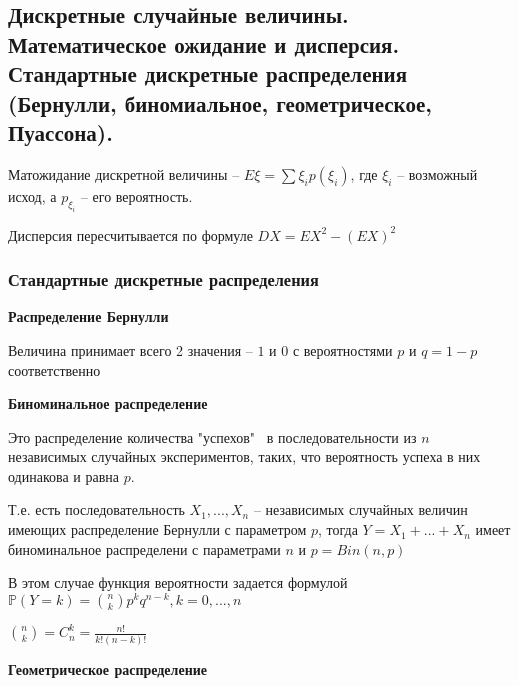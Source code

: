 \subsection{Дискретные случайные величины. Математическое ожидание и дисперсия. Стандартные дискретные распределения (Бернулли, биномиальное, геометрическое, Пуассона).}




Матожидание дискретной величины -- $E\xi = \sum \xi_i p(\xi_i)$, где $\xi_i$ -- возможный исход, а $p_{\xi_i}$ -- его вероятность.

Дисперсия пересчитывается по формуле $DX = EX^2 - (EX)^2$

\subsubsection{ Стандартные дискретные распределения}

{\bf Распределение Бернулли}

Величина принимает всего 2 значения -- $1$ и $0$ с вероятностями $p$ и $q = 1 - p$ соответственно

{\bf Биноминальное распределение}

Это распределение количества "успехов" \ в последовательности из $n$ независимых случайных экспериментов, таких, что вероятность успеха в них одинакова и равна $p$.

Т.е. есть последовательность $X_1, ..., X_n$ -- независимых случайных величин имеющих распределение Бернулли с параметром $p$, тогда $Y = X_1 + ... + X_n$ имеет биноминальное распределени с параметрами $n$ и $p = Bin(n, p)$ 

В этом случае функция вероятности задается формулой $\mathbb{P}(Y = k) = {n \choose k} p^k q^{n - k}, k = 0, ..., n$

${n \choose k} = C_n^k = \frac{n!}{k!(n-k)!}$

{\bf Геометрическое распределение}

